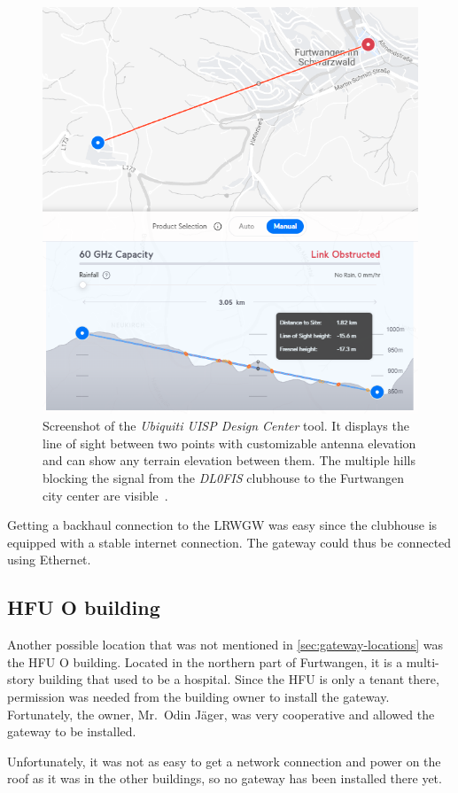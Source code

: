 \begin{figure}[htbp]
    \centering
    \includegraphics[width=.6\textwidth]{pictures/hardware/gateway-deployment/line-of-sight-dl0fis.png}
    \caption{
        Screenshot of the \emph{Ubiquiti UISP Design Center} tool.
        It displays the line of sight between two points with customizable antenna elevation and can show any terrain elevation between them.
        The multiple hills blocking the signal from the \emph{DL0FIS} clubhouse to the Furtwangen city center are visible~\cite{ubiquiti_inc_uisp_2023}.
    }\label{pic:dl0fis_gw_los}
\end{figure}

Getting a backhaul connection to the \acl{LRWGW} was easy since the clubhouse is equipped with a stable internet connection.
The gateway could thus be connected using Ethernet.

\subsection{\acl{HFU} O building}\label{subsec:conclusion-hfu-o-building}

Another possible location that was not mentioned in \cref{sec:gateway-locations} was the \ac{HFU} O building.
Located in the northern part of Furtwangen, it is a multi-story building that used to be a hospital.
Since the \ac{HFU} is only a tenant there, permission was needed from the building owner to install the gateway.
Fortunately, the owner, Mr.\ Odin Jäger, was very cooperative and allowed the gateway to be installed.

Unfortunately, it was not as easy to get a network connection and power on the roof as it was in the other buildings, so no gateway has been installed there yet.

